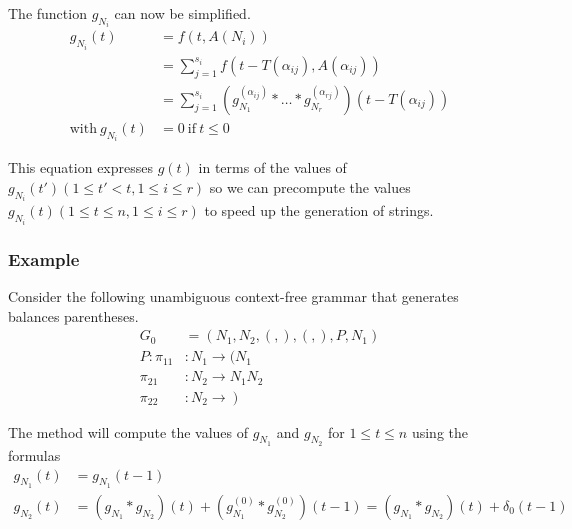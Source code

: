   The function $g_{N_i}$ can now be simplified.
  \begin{align*}
  g_{N_i}(t) &= f(t, A(N_i)) \\
  &= \sum_{j=1}^{s_i} f(t-T(\alpha_{ij}), A(\alpha_{ij})) \\
  &= \sum_{j=1}^{s_i} \left(g_{N_1}^{(\alpha_{ij})} * \hdots * g_{N_r}^{(\alpha_{rj})}\right)(t - T(\alpha_{ij})) \\
  \mathrm{with}\ g_{N_i}(t) &= 0\ \mathrm{if}\ t \leq 0
  \end{align*}

  This equation expresses $g(t)$ in terms of the values of $g_{N_i}(t')(1 \leq t' < t, 1 \leq i \leq r)$ so we can precompute the values $g_{N_i}(t)(1 \leq t \leq n, 1 \leq i \leq r)$ to speed up the generation of strings.

  \subsubsection{Example}

    Consider the following unambiguous context-free grammar that generates balances parentheses.
    \begin{align*}
    G_0 &= ({N_1, N_2, (, )}, {(, )}, P, N_1) \\
    P : \pi_{11} &: N_1 \to (N_1 \\
        \pi_{21} &: N_2 \to N_1 N_2 \\
        \pi_{22} &: N_2 \to\ )
    \end{align*}

    The method will compute the values of $g_{N_1}$ and $g_{N_2}$ for $1 \leq t \leq n$ using the formulas
    \begin{align*}
    g_{N_1}(t) &= g_{N_1}(t-1) \\
    g_{N_2}(t) &= (g_{N_1} * g_{N_2})(t) + (g_{N_1}^{(0)} * g_{N_2}^{(0)})(t-1) = (g_{N_1} * g_{N_2})(t) + \delta_0(t-1)
    \end{align*}

    